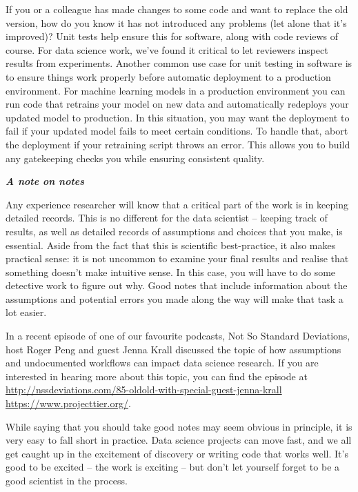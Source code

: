 \documentclass[
]{book}
\begin{document}
If you or a colleague has made changes to some code and want to replace
the old version, how do you know it has not introduced any problems (let
alone that it's improved)? Unit tests help ensure this for software,
along with code reviews of course. For data science work, we've found it
critical to let reviewers inspect results from experiments. Another
common use case for unit testing in software is to ensure things work
properly before automatic deployment to a production environment. For
machine learning models in a production environment you can run code
that retrains your model on new data and automatically redeploys your
updated model to production. In this situation, you may want the
deployment to fail if your updated model fails to meet certain
conditions. To handle that, abort the deployment if your retraining
script throws an error. This allows you to build any gatekeeping checks
you while ensuring consistent quality.

\begin{infobox}

\textbf{\emph{A note on notes}}

Any experience researcher will know that a critical part of the work is
in keeping detailed records. This is no different for the data scientist
-- keeping track of results, as well as detailed records of assumptions
and choices that you make, is essential. Aside from the fact that this
is scientific best-practice, it also makes practical sense: it is not
uncommon to examine your final results and realise that something
doesn't make intuitive sense. In this case, you will have to do some
detective work to figure out why. Good notes that include information
about the assumptions and potential errors you made along the way will
make that task a lot easier.

In a recent episode of one of our favourite podcasts, Not So Standard
Deviations, host Roger Peng and guest Jenna Krall discussed the topic of
how assumptions and undocumented workflows can impact data science
research. If you are interested in hearing more about this topic, you
can find the episode at
\url{http://nssdeviations.com/85-oldold-with-special-guest-jenna-krall}
\url{https://www.projecttier.org/}.

While saying that you should take good notes may seem obvious in
principle, it is very easy to fall short in practice. Data science
projects can move fast, and we all get caught up in the excitement of
discovery or writing code that works well. It's good to be excited --
the work is exciting -- but don't let yourself forget to be a good
scientist in the process.

\end{infobox}
\end{document}
